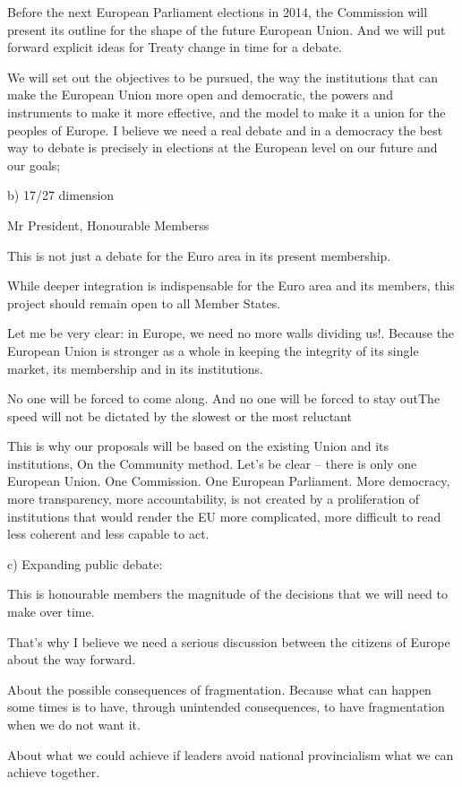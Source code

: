 \documentclass[a4paper,11pt]{article}
\begin{document}
Before the next European Parliament elections in 2014, the Commission will present its outline for the shape of the future European Union. And we will put forward explicit ideas for Treaty change in time for a debate.

We will set out the objectives to be pursued, the way the institutions that can make the European Union more open and democratic, the powers and instruments to make it more effective, and the model to make it a union for the peoples of Europe. I believe we need a real debate and in a democracy the best way to debate is precisely in elections at the European level on our future and our goals;

b) 17/27 dimension

Mr President, Honourable Memberss

This is not just a debate for the Euro area in its present membership.

While deeper integration is indispensable for the Euro area and its members, this project should remain open to all Member States.

Let me be very clear: in Europe, we need no more walls dividing us!. Because the European Union is stronger as a whole in keeping the integrity of its single market, its membership and in its institutions.

No one will be forced to come along. And no one will be forced to stay outThe speed will not be dictated by the slowest or the most reluctant

This is why our proposals will be based on the existing Union and its institutions, On the Community method. Let's be clear – there is only one European Union. One Commission. One European Parliament. More democracy, more transparency, more accountability, is not created by a proliferation of institutions that would render the EU more complicated, more difficult to read less coherent and less capable to act.

c) Expanding public debate:

This is honourable members the magnitude of the decisions that we will need to make over time.

That's why I believe we need a serious discussion between the citizens of Europe about the way forward.

About the possible consequences of fragmentation. Because what can happen some times is to have, through unintended consequences, to have fragmentation when we do not want it.

About what we could achieve if leaders avoid national provincialism what we can achieve together.
\end{document}
